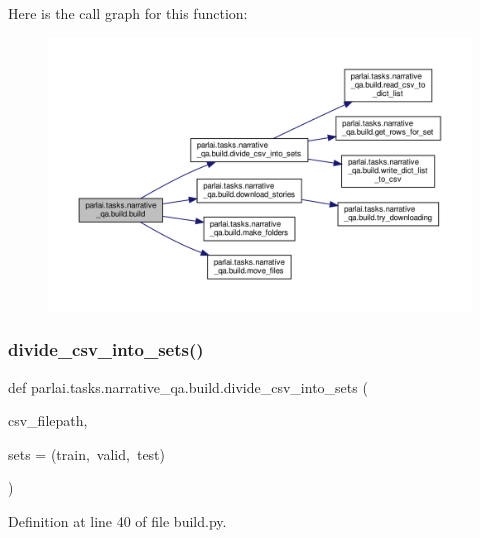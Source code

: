 Here is the call graph for this function\+:
\nopagebreak
\begin{figure}[H]
\begin{center}
\leavevmode
\includegraphics[width=350pt]{namespaceparlai_1_1tasks_1_1narrative__qa_1_1build_a51a4aace1ca9f9cbdc332405edaf1ef5_cgraph}
\end{center}
\end{figure}
\mbox{\label{namespaceparlai_1_1tasks_1_1narrative__qa_1_1build_a104cbf949215e7b505c73b33017b1970}} 
\subsubsection{\texorpdfstring{divide\+\_\+csv\+\_\+into\+\_\+sets()}{divide\_csv\_into\_sets()}}
{\footnotesize\ttfamily def parlai.\+tasks.\+narrative\+\_\+qa.\+build.\+divide\+\_\+csv\+\_\+into\+\_\+sets (\begin{DoxyParamCaption}\item[{}]{csv\+\_\+filepath,  }\item[{}]{sets = {\ttfamily (\textquotesingle{}train\textquotesingle{},~\textquotesingle{}valid\textquotesingle{},~\textquotesingle{}test\textquotesingle{})} }\end{DoxyParamCaption})}



Definition at line 40 of file build.\+py.



